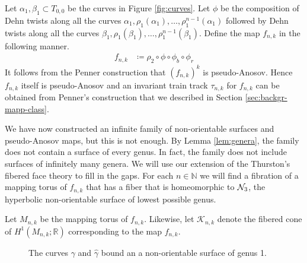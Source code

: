 Let $\alpha_1,\beta_1 \subset T_{0,0}$ be the curves in Figure \ref{fig:curves}. Let $\phi$ be the composition
of Dehn twists along all the curves $\alpha_1, \rho_1(\alpha_1), \dots, \rho_1^{n-1}(\alpha_1)$ followed by
Dehn twists along all the curves $\beta_1,\rho_1(\beta_1),\dots,\rho_1^{n-1}(\beta_1)$. Define the map $f_{n,k}$
in the following manner.
\begin{align*}
    f_{n,k} &\coloneqq \rho_2 \circ \phi \circ \phi_b \circ \phi_r
\end{align*}
It follows from the Penner construction that $(f_{n,k})^k$ is pseudo-Anosov. Hence $f_{n,k}$ itself is
pseudo-Anosov and an invariant train track $\tau_{n,k}$ for $f_{n,k}$ can be obtained from Penner's
construction that we described in Section \ref{sec:backgr-mapp-class}.


We have now constructed an infinite family of non-orientable surfaces and pseudo-Anosov maps, but this is not
enough. By Lemma \ref{lem:genera}, the family does not contain a surface of every genus. In fact, the family does not include surfaces of infinitely many genera. We will use our extension of the Thurston's
fibered face theory to fill in the gaps.  For each $n\in\mathbb{N}$ we will find a fibration of a mapping torus of $f_{n,k}$ that has a fiber that is homeomorphic to $\mathcal{N}_3$, the hyperbolic non-orientable surface of lowest possible genus.

Let $M_{n,k}$ be the mapping torus of $f_{n,k}$. Likewise, let $\mathcal{K}_{n,k}$ denote the fibered cone of
$H^1(M_{n,k};\mathbb{R})$ corresponding to the map $f_{n,k}$. %

\begin{figure}[h]
    \centering
    \caption{The curves $\gamma$ and $\widehat{\gamma}$ bound an a non-orientable surface of genus 1.}
    \label{fig:gammacurves}
\end{figure}


